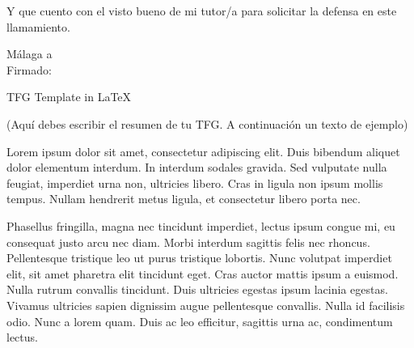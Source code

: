 \documentclass[12pt,a4paper]{report}
\numberwithin{figure}{section} %
\numberwithin{table}{section} %
\begin{document}
\vspace{12pt}

Y que cuento con el visto bueno de mi tutor/a para solicitar la defensa en este llamamiento.
\begin{flushright}
    Málaga a  \makebox[2cm]{\dotfill} \\
    \vspace{5cm}
     Firmado: \makebox[5cm]{\dotfill}
\end{flushright}



\newpage
{} %

\renewcommand{\contentsname}{ÍNDICE}
\tableofcontents

\newpage 
{} 

\vspace{12pt}

\noindent TFG Template in \LaTeX %

\vspace{12pt}


\vspace{12pt}

(Aquí debes escribir el resumen de tu TFG. A continuación un texto de ejemplo)

\vspace{12pt}

Lorem ipsum dolor sit amet, consectetur adipiscing elit. Duis bibendum aliquet dolor elementum interdum. In interdum sodales gravida. Sed vulputate nulla feugiat, imperdiet urna non, ultricies libero. Cras in ligula non ipsum mollis tempus. Nullam hendrerit metus ligula, et consectetur libero porta nec. 

\vspace{12pt}

Phasellus fringilla, magna nec tincidunt imperdiet, lectus ipsum congue mi, eu consequat justo arcu nec diam. Morbi interdum sagittis felis nec rhoncus. Pellentesque tristique leo ut purus tristique lobortis. Nunc volutpat imperdiet elit, sit amet pharetra elit tincidunt eget. Cras auctor mattis ipsum a euismod. Nulla rutrum convallis tincidunt. Duis ultricies egestas ipsum lacinia egestas. Vivamus ultricies sapien dignissim augue pellentesque convallis. Nulla id facilisis odio. Nunc a lorem quam. Duis ac leo efficitur, sagittis urna ac, condimentum lectus.
\end{document}
